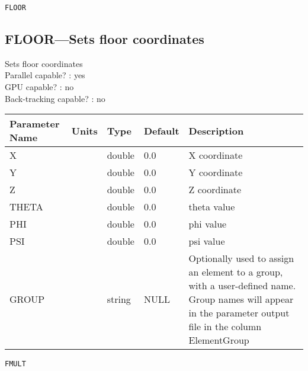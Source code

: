 \vspace*{0.5in}

\newpage
\begin{center}{\Large\verb|FLOOR|}\end{center}
\subsection{FLOOR---Sets floor coordinates}
Sets floor coordinates
\\
Parallel capable? : yes\\
GPU capable? : no\\
Back-tracking capable? : no\\
\begin{tabular}{|l|l|l|l|p{\descwidth}|} \hline
Parameter Name & Units & Type & Default & Description \\ \hline 
X &  & double &  0.0 & X coordinate  \\ \hline 
Y &  & double &  0.0 & Y coordinate  \\ \hline 
Z &  & double &  0.0 & Z coordinate  \\ \hline 
THETA &  & double &  0.0 & theta value  \\ \hline 
PHI &  & double &  0.0 & phi value  \\ \hline 
PSI &  & double &  0.0 & psi value  \\ \hline 
GROUP &  & string & NULL & Optionally used to assign an element to a group, with a user-defined name.  Group names will appear in the parameter output file in the column ElementGroup  \\ \hline 
\end{tabular}

\newpage
\begin{center}{\Large\verb|FMULT|}\end{center}

